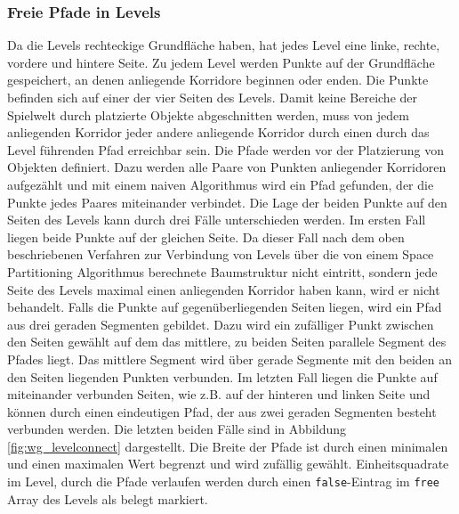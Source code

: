 \subsubsection{Freie Pfade in Levels}
Da die Levels rechteckige Grundfläche haben, hat jedes Level eine linke, rechte, vordere und hintere Seite. Zu jedem Level werden Punkte auf der Grundfläche gespeichert, an denen anliegende Korridore beginnen oder enden. Die Punkte befinden sich auf einer der vier Seiten des Levels. Damit keine Bereiche der Spielwelt durch platzierte Objekte abgeschnitten werden, muss von jedem anliegenden Korridor jeder andere anliegende Korridor durch einen durch das Level führenden Pfad erreichbar sein. Die Pfade  werden vor der Platzierung von Objekten definiert. Dazu werden alle Paare von Punkten anliegender Korridoren aufgezählt und mit einem naiven Algorithmus wird ein Pfad gefunden, der die Punkte jedes Paares miteinander verbindet. Die Lage der beiden Punkte auf den Seiten des Levels kann durch drei Fälle unterschieden werden. Im ersten Fall liegen beide Punkte auf der gleichen Seite. Da dieser Fall nach dem oben beschriebenen Verfahren zur Verbindung von Levels über die von einem Space Partitioning Algorithmus berechnete Baumstruktur nicht eintritt, sondern jede Seite des Levels maximal einen anliegenden Korridor haben kann, wird er nicht behandelt. Falls die Punkte auf gegenüberliegenden Seiten liegen, wird ein Pfad aus drei geraden Segmenten gebildet. Dazu wird ein zufälliger Punkt zwischen den Seiten gewählt auf dem das mittlere, zu beiden Seiten parallele Segment des Pfades liegt. Das mittlere Segment wird über gerade Segmente mit den beiden an den Seiten liegenden Punkten verbunden. Im letzten Fall liegen die Punkte auf miteinander verbunden Seiten, wie z.B. auf der hinteren und linken Seite und können durch einen eindeutigen Pfad, der aus zwei geraden Segmenten besteht verbunden werden. Die letzten beiden Fälle sind in Abbildung \ref{fig:wg_levelconnect} dargestellt. Die Breite der Pfade ist durch einen minimalen und einen maximalen Wert begrenzt und wird zufällig gewählt. Einheitsquadrate im Level, durch die Pfade verlaufen werden durch einen \texttt{false}-Eintrag im \texttt{free} Array des Levels als belegt markiert.

